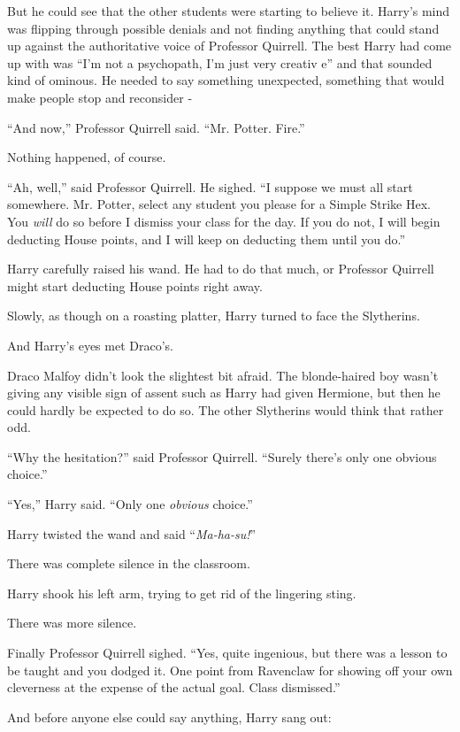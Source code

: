 But he could see that the other students were starting to believe it. Harry's mind was flipping through possible denials and not finding anything that could stand up against the authoritative voice of Professor Quirrell. The best Harry had come up with was ``I'm not a psychopath, I'm just very creativ e'' and that sounded kind of ominous. He needed to say something unexpected, something that would make people stop and reconsider -

``And now,'' Professor Quirrell said. ``Mr. Potter. Fire.''

Nothing happened, of course.

``Ah, well,'' said Professor Quirrell. He sighed. ``I suppose we must all start somewhere. Mr. Potter, select any student you please for a Simple Strike Hex. You \emph{will} do so before I dismiss your class for the day. If you do not, I will begin deducting House points, and I will keep on deducting them until you do.''

Harry carefully raised his wand. He had to do that much, or Professor Quirrell might start deducting House points right away.

Slowly, as though on a roasting platter, Harry turned to face the Slytherins.

And Harry's eyes met Draco's.

Draco Malfoy didn't look the slightest bit afraid. The blonde-haired boy wasn't giving any visible sign of assent such as Harry had given Hermione, but then he could hardly be expected to do so. The other Slytherins would think that rather odd.

``Why the hesitation?'' said Professor Quirrell. ``Surely there's only one obvious choice.''

``Yes,'' Harry said. ``Only one \emph{obvious} choice.''

Harry twisted the wand and said ``\emph{Ma-ha-su!}''

There was complete silence in the classroom.

Harry shook his left arm, trying to get rid of the lingering sting.

There was more silence.

Finally Professor Quirrell sighed. ``Yes, quite ingenious, but there was a lesson to be taught and you dodged it. One point from Ravenclaw for showing off your own cleverness at the expense of the actual goal. Class dismissed.''

And before anyone else could say anything, Harry sang out:

